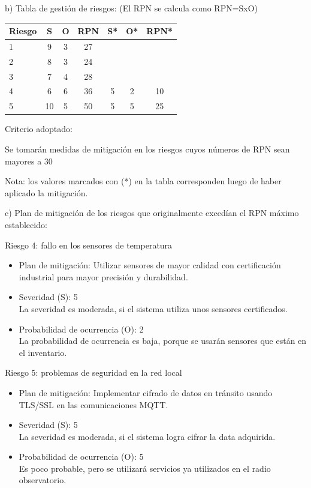 \documentclass[
11pt, %
]{charter}
\begin{document}
b) Tabla de gestión de riesgos: (El RPN se calcula como RPN=SxO)

\begin{table}[htpb]
\centering
\begin{tabularx}{\linewidth}{@{}|X|c|c|c|c|c|c|@{}}
\hline
\rowcolor[HTML]{C0C0C0} 
Riesgo & S & O & RPN & S* & O* & RPN* \\ \hline
     1 & 9 & 3 &  27 &    &    &      \\ \hline
     2 & 8 & 3 &  24 &    &    &      \\ \hline
     3 & 7 & 4 &  28 &    &    &      \\ \hline
     4 & 6 & 6 &  36 & 5  & 2  & 10   \\ \hline
     5 & 10 & 5 & 50 & 5  & 5  & 25   \\ \hline
\end{tabularx}%
\end{table}

Criterio adoptado: 

Se tomarán medidas de mitigación en los riesgos cuyos números de RPN sean mayores a 30

Nota: los valores marcados con (*) en la tabla corresponden luego de haber aplicado la mitigación.

c) Plan de mitigación de los riesgos que originalmente excedían el RPN máximo establecido:
 
Riesgo 4: fallo en los sensores de temperatura
  \begin{itemize}
  	\item Plan de mitigación: Utilizar sensores de mayor calidad con certificación industrial para mayor precisión y durabilidad.
	\item Severidad (S): 5 \\ 
	La severidad es moderada, si el sistema utiliza unos sensores certificados.
	\item Probabilidad de ocurrencia (O): 2 \\
	La probabilidad de ocurrencia es baja, porque se usarán sensores que están en el inventario.
	\end{itemize}
\newpage
Riesgo 5: problemas de seguridad en la red local
\begin{itemize}
	\item Plan de mitigación: Implementar cifrado de datos en tránsito usando TLS/SSL en las comunicaciones MQTT.
	\item Severidad (S): 5 \\ 
	La severidad es moderada, si el sistema logra cifrar la data adquirida.
	\item Probabilidad de ocurrencia (O): 5 \\
	Es poco probable, pero se utilizará servicios ya utilizados en el radio observatorio.
\end{itemize}   
\end{document}
